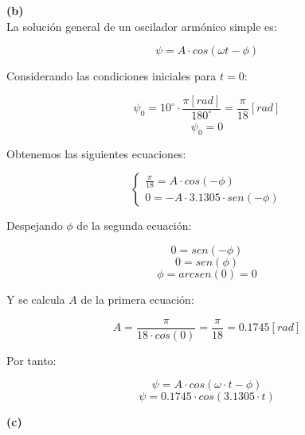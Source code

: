 \documentclass[letter,11pt]{article}
\begin{document}
\textbf{(b)} \\

La solución general de un oscilador armónico simple es:

\begin{equation*}
    \psi = A \cdot cos(\omega t - \phi)
\end{equation*}

Considerando las condiciones iniciales para $t = 0$:

\begin{equation*}
    \psi_0 = 10^\circ \cdot \frac{\pi [rad]}{180^\circ} = \frac{\pi}{18} [rad]
\end{equation*}
\begin{equation*}
    \dot{\psi_0} = 0
\end{equation*}

Obtenemos las siguientes ecuaciones:

\begin{equation}
    \begin{cases}
        \frac{\pi}{18} = A \cdot cos(- \phi) \\
        0 = -A \cdot 3.1305 \cdot sen(- \phi)
    \end{cases}
\end{equation}

Despejando $\phi$ de la segunda ecuación:

\begin{equation*}
    0 = sen(-\phi)
\end{equation*}
\begin{equation*}
    0 = sen(\phi)
\end{equation*}
\begin{equation}
    \phi = arcsen(0) = 0
\end{equation}

Y se calcula $A$ de la primera ecuación:

\begin{equation}
    A = \frac{\pi}{18 \cdot cos(0)} = \frac{\pi}{18} = 0.1745 [rad]
\end{equation}

Por tanto:

\begin{equation*}
    \psi = A \cdot cos(\omega \cdot t - \phi)
\end{equation*}
\begin{equation}
    \psi = 0.1745 \cdot cos(3.1305 \cdot t)
\end{equation}

\textbf{(c)} \\
\end{document}
